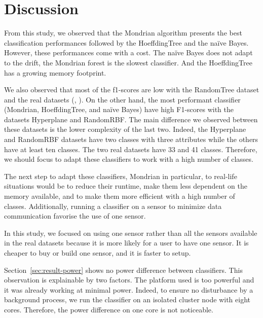 \section{Discussion}
From this study, we observed that the Mondrian algorithm presents the best
classification performances followed by the HoeffdingTree and the naïve Bayes.
However, these performances come with a cost.  The naïve Bayes does not adapt
to the drift, the Mondrian forest is the slowest classifier. And the
HoeffdingTree has a growing memory footprint.

We also observed that most of the f1-scores are low with the RandomTree dataset and
the real datasets (\banosdataset, \recofitdataset). On the other hand, the most
performant classifier (Mondrian, HoeffdingTree, and naïve Bayes) have high
F1-scores with the datasets Hyperplane and RandomRBF. The main difference we
observed between these datasets is the lower complexity of the last two.
Indeed, the Hyperplane and RandomRBF datasets have two classes with three
attributes while the others have at least ten classes. The two real datasets
have 33 and 41 classes. Therefore, we should focus to adapt these classifiers
to work with a high number of classes.

The next step to adapt these classifiers, Mondrian in particular, to real-life
situations would be to reduce their runtime, make them less dependent on the
memory available, and to make them more efficient with a high number of
classes. Additionally, running a classifier on a sensor to minimize data
communication favorise the use of one sensor.


In this study, we focused on using one sensor rather than all the sensors
available in the real datasets because it is more likely for a user to have one
sensor. It is cheaper to buy or build one sensor, and it is faster to setup.


Section~\ref{sec:result-power} shows no power difference between classifiers. This
observation is explainable by two factors. The platform used is too powerful
and it was already working at minimal power. Indeed, to ensure no disturbance
by a background process, we run the classifier on an isolated cluster node with
eight cores. Therefore, the power difference on one core is not noticeable.

